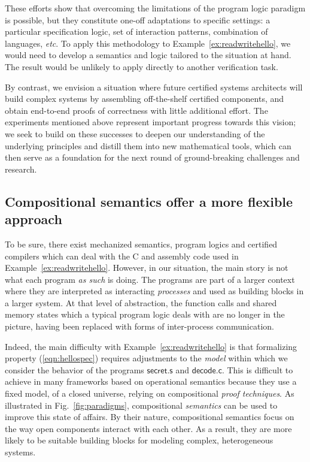 \documentclass[acmsmall,nonacm]{acmart}
\newcommand{\kw}[1]{\ensuremath{ \mathsf{#1} }}
\begin{document}
These efforts show that overcoming the limitations of
the program logic paradigm is possible,
but they constitute one-off adaptations to specific settings:
a particular specification logic,
set of interaction patterns,
combination of languages,
\emph{etc}.
To apply this methodology to Example~\ref{ex:readwritehello},
we would need to develop a semantics and logic 
tailored to the situation at hand.
The result would be unlikely to apply directly
to another verification task.

By contrast,
we envision a situation where future certified systems architects
will build complex systems by assembling off-the-shelf certified components,
and obtain end-to-end proofs of correctness with little additional effort.
The experiments mentioned above represent important progress towards this vision;
we seek to build on these successes
to deepen our understanding of the underlying principles
and distill them into new mathematical tools,
which can then serve as a foundation for the next round of
ground-breaking challenges and research.


\subsection{Compositional semantics offer a more flexible approach} %
\label{sec:intro:compsem}

To be sure,
there exist
mechanized semantics, program logics and certified compilers
which can deal with the C and assembly code used in Example~\ref{ex:readwritehello}.
However, in our situation,
the main story is not
what each program \emph{as such} is doing.
The programs are part of a larger context where
they are interpreted as interacting \emph{processes}
and used as building blocks in a larger system.
%
At that level of abstraction,
the function calls and shared memory states
which a typical program logic deals with
are no longer in the picture,
having been replaced with
forms of inter-process communication.

Indeed,
the main difficulty with Example~\ref{ex:readwritehello}
is that formalizing property (\ref{eqn:hellospec})
requires adjustments to the \emph{model}
within which we consider the behavior of
the programs \kw{secret.s} and \kw{decode.c}.
This is difficult to achieve
in many frameworks based on operational semantics
because they use a fixed model, of a closed universe,
relying on compositional \emph{proof techniques}.
%
As illustrated in Fig.~\ref{fig:paradigms},
compositional \emph{semantics} can be used to improve
this state of affairs.
By their nature,
compositional semantics focus on
the way
open components
interact with each other.
As a result,
they are more likely to be suitable
building blocks for
modeling complex, heterogeneous systems.
\end{document}
